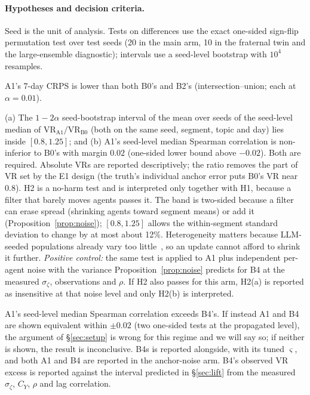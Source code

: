 \documentclass[10pt]{article}
\theoremstyle{remark}
\begin{document}
\paragraph{Hypotheses and decision criteria.} Seed is the unit of analysis. Tests on differences use the exact one-sided sign-flip permutation test over test seeds (20 in the main arm, 10 in the fraternal twin and the large-ensemble diagnostic); intervals use a seed-level bootstrap with $10^4$ resamples.
\begin{description}
\setlength\itemsep{1pt}
\item[H1 (primary, skill).] A1's 7-day CRPS is lower than both B0's and B2's (intersection--union; each at $\alpha=0.01$).
\item[H2 (primary, within-segment heterogeneity).] (a) The $1-2\alpha$ seed-bootstrap interval of the mean over seeds of the seed-level median of $\mathrm{VR}_{\mathrm{A1}}/\mathrm{VR}_{\mathrm{B0}}$ (both on the same seed, segment, topic and day) lies inside $[0.8,1.25]$; and (b) A1's seed-level median Spearman correlation is non-inferior to B0's with margin $0.02$ (one-sided lower bound above $-0.02$). Both are required. Absolute VRs are reported descriptively; the ratio removes the part of VR set by the E1 design (the truth's individual anchor error puts B0's VR near $0.8$). H2 is a no-harm test and is interpreted only together with H1, because a filter that barely moves agents passes it. The band is two-sided because a filter can erase spread (shrinking agents toward segment means) or add it (Proposition~\ref{prop:noise}); $[0.8,1.25]$ allows the within-segment standard deviation to change by at most about 12\%. Heterogeneity matters because LLM-seeded populations already vary too little~\cite{bisbee2024,ozkan2026}, so an update cannot afford to shrink it further. \emph{Positive control:} the same test is applied to A1 plus independent per-agent noise with the variance Proposition~\ref{prop:noise} predicts for B4 at the measured $\sigma_\zeta$, observations and $\rho$. If H2 also passes for this arm, H2(a) is reported as insensitive at that noise level and only H2(b) is interpreted.
\item[H3 (secondary, per-agent filter).] A1's seed-level median Spearman correlation exceeds B4's. If instead A1 and B4 are shown equivalent within $\pm0.02$ (two one-sided tests at the propagated level), the argument of \S\ref{sec:setup} is wrong for this regime and we will say so; if neither is shown, the result is inconclusive. B4s is reported alongside, with its tuned $\varsigma$, and both A1 and B4 are reported in the anchor-noise arm. B4's observed VR excess is reported against the interval predicted in \S\ref{sec:lift} from the measured $\sigma_\zeta$, $C_Y$, $\rho$ and lag correlation.

\end{description}
\end{document}
